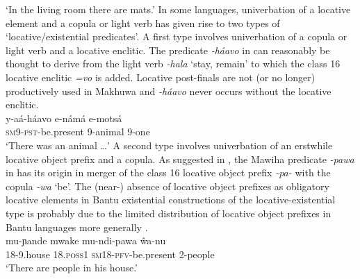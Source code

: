 \documentclass[output=paper]{langsci/langscibook}
\begin{document}
\glt `In the living room there are mats.'
\z
In some languages, univerbation of a locative element and a copula or light
verb has given rise to two types of `locative/existential predicates'. A first type involves univerbation of a copula or light verb and a locative enclitic. The  predicate \textit{-h{\'a}avo} in  can reasonably be thought to derive from the light verb \textit{-hala} `stay, remain' to which the class 16 locative enclitic \textit{=vo} is added. Locative post-finals are not (or no longer) productively used in Makhuwa and \textit{-h{\'a}avo} never occurs without the locative enclitic.
\ea\label{ex:makhuwa-animal}
\\
\gll y-a{\'a}-h{\'a}avo e-n{\'a}m{\'a} e-mots{\'a}\\
	\textsc{sm9-pst}-be.present 9-animal 9-one\\
\glt `There was an animal \ldots{}'
\z
A second type involves univerbation of an erstwhile locative object prefix and a copula. As suggested in \citet{BernanderDevos2018}, the Mawiha predicate \textit{-pawa} in  has its origin in merger of the class 16 locative object prefix \textit{-pa-} with the copula \textit{-wa} `be'. The (near-) absence of locative object prefixes as obligatory locative elements in Bantu existential constructions of the locative-existential type is probably due to the limited distribution of locative object prefixes in Bantu languages more generally \citep{Marlo2015,ZellerXXXX}.
\ea\label{ex:mawiha-house}
\\
\gll mu-ɲande mwake mu-ndi-pawa {\^w}a-nu\\
	18-9.house 18.\textsc{poss}1 \textsc{sm}18-\textsc{pfv}-be.present 2-people\\
\glt `There are people in his house.'
\z
\end{document}
